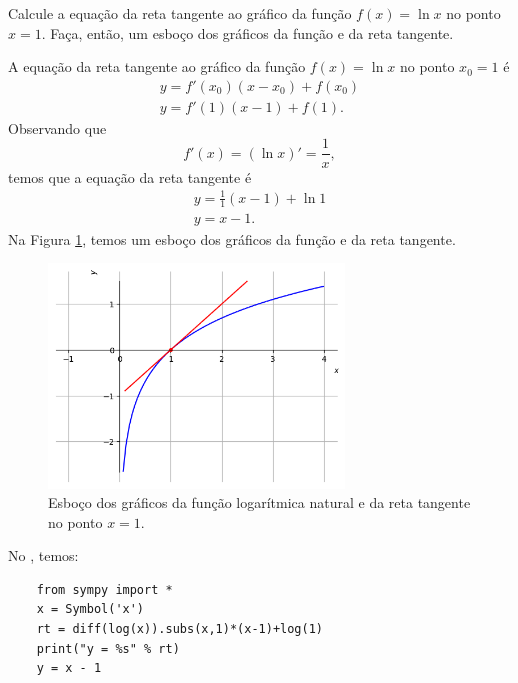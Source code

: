 \begin{exeresol}
  Calcule a equação da reta tangente ao gráfico da função $f(x) = \ln x$ no ponto $x=1$. Faça, então, um esboço dos gráficos da função e da reta tangente.
\end{exeresol}
\begin{resol}
  A equação da reta tangente ao gráfico da função $f(x) = \ln x$ no ponto $x_0=1$ é
  \begin{gather}
    y = f'(x_0)(x-x_0)+f(x_0) \\
    y = f'(1)(x-1)+f(1).
  \end{gather}
  Observando que
  \begin{equation}
    f'(x) = (\ln x)' = \frac{1}{x},
  \end{equation}
  temos que a equação da reta tangente é
  \begin{gather}
    y = \frac{1}{1}(x-1)+\ln 1 \\
    y = x-1.
  \end{gather}
  Na Figura \ref{fig:deriv_exeresol_rt_ln}, temos um esboço dos gráficos da função e da reta tangente.

  \begin{figure}[H]
    \centering
    \includegraphics[width=0.7\textwidth]{./cap_deriv/dados/fig_deriv_exeresol_rt_ln/fig_deriv_exeresol_rt_ln}
    \caption{Esboço dos gráficos da função logarítmica natural e da reta tangente no ponto $x=1$.}
    \label{fig:deriv_exeresol_rt_ln}
  \end{figure}

  \ifispython
  No \sympy, temos:
  \begin{lstlisting}
    from sympy import *
    x = Symbol('x')
    rt = diff(log(x)).subs(x,1)*(x-1)+log(1)
    print("y = %s" % rt)
    y = x - 1
  \end{lstlisting}
  \fi    
\end{resol}

